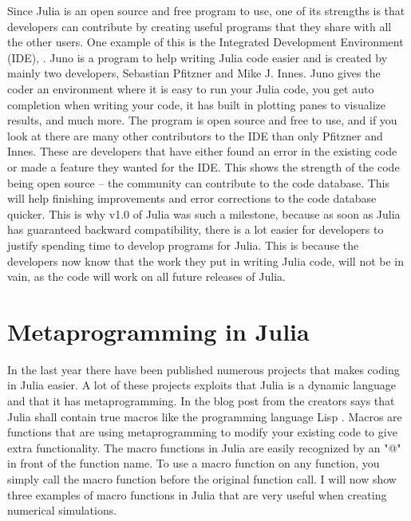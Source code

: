 Since Julia is an open source and free program to use, one of its strengths is that developers can contribute by creating useful programs that they share with all the other users. One example of this is the Integrated Development Environment (IDE), \cite{JunoIDE}. Juno is a program to help writing Julia code easier and is created by mainly two developers, Sebastian Pfitzner and Mike J. Innes. Juno gives the coder an environment where it is easy to run your Julia code, you get auto completion when writing your code, it has built in plotting panes to visualize results, and much more. The program is open source and free to use, and if you look at \cite{JunoGithub} there are many other contributors to the IDE than only Pfitzner and Innes. These are developers that have either found an error in the existing code or made a feature they wanted for the IDE. This shows the strength of the code being open source -- the community can contribute to the code database. This will help finishing improvements and error corrections to the code database quicker. This is why v1.0 of Julia was such a milestone, because as soon as Julia has guaranteed backward compatibility, there is a lot easier for developers to justify spending time to develop programs for Julia. This is because the developers now know that the work they put in writing Julia code, will not be in vain, as the code will work on all future releases of Julia. 

\section{Metaprogramming in Julia}
\label{sec:Metaprogramming}
In the last year there have been published numerous projects that makes coding in Julia easier. A lot of these projects exploits that Julia is a dynamic language and that it has metaprogramming. In the blog post from \cite{juliaBlogRelease2012} the creators says that Julia shall contain true macros like the programming language Lisp \emph{\citep{Lisp}}. Macros are functions that are using metaprogramming to modify your existing code to give extra functionality. The macro functions in Julia are easily recognized by an "@" in front of the function name. To use a macro function on any function, you simply call the macro function before the original function call. I will now show three examples of macro functions in Julia that are very useful when creating numerical simulations.
